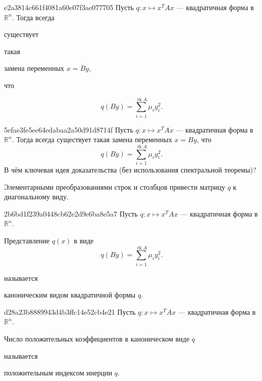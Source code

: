 \begin{note}{e2a3814c661f4081a60e07f3ae077705}
    Пусть \({ q : x \mapsto x^{T}Ax }\) --- квадратичная форма в \({ \mathbb R^{n} }\).
    Тогда всегда \begin{icloze}{3}существует\end{icloze} такая \begin{icloze}{2}замена переменных \({ x = By }\),\end{icloze} что
    \begin{icloze}{1}
        \[
            q(By) = \sum_{i=1}^{\operatorname{rk} A} \mu_i y_i^2.
        \]
    \end{icloze}
\end{note}

\begin{note}{5efae3fe5ee64edabaa2a50d91d8714f}
    Пусть \({ q : x \mapsto x^{T}Ax }\) --- квадратичная форма в \({ \mathbb R^{n} }\).
    Тогда всегда существует такая замена переменных \({ x = By }\), что
    \[
        q(By) = \sum_{i=1}^{\operatorname{rk} A} \mu_i y_i^2.
    \]
    В чём ключевая идея доказательства (без использования спектральной теоремы)?

    \begin{cloze}{1}
        Элементарными преобразованиями строк и столбцов привести матрицу \({ q }\) к диагональному виду.
    \end{cloze}
\end{note}

\begin{note}{2b6bd1f239a0448cb62e2d9e6ba8e5a7}
    Пусть \({ q : x \mapsto x^{T}Ax }\) --- квадратичная форма в \({ \mathbb R^{n} }\).
    \begin{icloze}{1}
        Представление \({ q(x) }\) в виде
        \[
            q(By) = \sum_{i=1}^{\operatorname{rk} A} \mu_i y_i^2.
        \]
    \end{icloze}
    называется \begin{icloze}{2}каноническим видом квадратичной формы \({ q }\).\end{icloze}
\end{note}

\begin{note}{d28a23b8889943d4b3ffc14e52cb4e21}
    Пусть \({ q : x \mapsto x^{T}Ax }\) --- квадратичная форма в \({ \mathbb R^{n} }\).
    \begin{icloze}{1}Число положительных коэффициентов в каноническом виде \({ q }\)\end{icloze} называется \begin{icloze}{2}положительным индексом инерции \({ q }\).\end{icloze}
\end{note}

